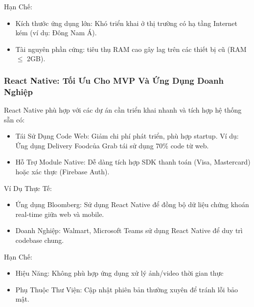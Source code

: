 \begin{flushleft}
  \hspace*{0.8cm}Hạn Chế:
  \setlength{\leftmargini}{1.5cm}
  \begin{itemize}
      \item Kích thước ứng dụng lớn: Khó triển khai ở thị trường có hạ tầng Internet kém (ví dụ: Đông Nam Á).
      \item Tài nguyên phần cứng: tiêu thụ RAM cao gây lag trên các thiết bị cũ (RAM $\leq$ 2GB).
  \end{itemize}
\end{flushleft}

\subsubsection{React Native: Tối Ưu Cho MVP Và Ứng Dụng Doanh Nghiệp}
    \begin{flushleft}
      \hspace*{0.8cm}React Native phù hợp với các dự án cần triển khai nhanh và tích hợp hệ thống sẵn có:
      \setlength{\leftmargini}{1.5cm}
      \begin{itemize}
        \item Tái Sử Dụng Code Web: Giảm chi phí phát triển, phù hợp startup. Ví dụ: Ứng dụng Delivery Foodcủa Grab tái sử dụng 70\% code từ web.
        \item Hỗ Trợ Module Native: Dễ dàng tích hợp SDK thanh toán (Visa, Mastercard) hoặc xác thực (Firebase Auth).
      \end{itemize}
    \end{flushleft}

    \begin{flushleft}
      \hspace*{0.8cm}Ví Dụ Thực Tế:
      \setlength{\leftmargini}{1.5cm}
      \begin{itemize}
          \item Ứng dụng Bloomberg: Sử dụng React Native để đồng bộ dữ liệu chứng khoán real-time giữa web và mobile.
          \item Doanh Nghiệp: Walmart, Microsoft Teams sử dụng React Native để duy trì codebase chung.
      \end{itemize}
    \end{flushleft}

    \begin{flushleft}
      \hspace*{0.8cm}Hạn Chế:
      \setlength{\leftmargini}{1.5cm}
      \begin{itemize}
          \item Hiệu Năng: Không phù hợp ứng dụng xử lý ảnh/video thời gian thực
          \item Phụ Thuộc Thư Viện: Cập nhật phiên bản thường xuyên để tránh lỗi bảo mật.
      \end{itemize}
    \end{flushleft}


